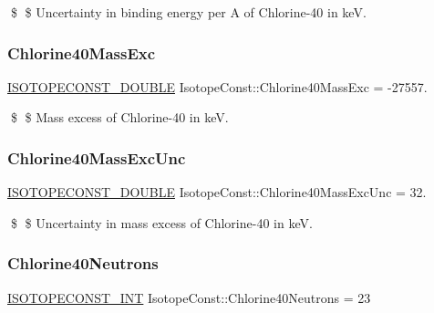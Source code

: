 \$ \$ Uncertainty in binding energy per A of Chlorine-\/40 in keV. \mbox{\label{group___isotope_const-_chlorine-_cl40_ga1b5ec545efeac4e0b2e7839cabdc1717}} 
\subsubsection{\texorpdfstring{Chlorine40\+Mass\+Exc}{Chlorine40MassExc}}
{\footnotesize\ttfamily \mbox{\hyperlink{group___isotope_const-_macros_ga8f45a7272ce02c0b4c65c44636ed719a}{I\+S\+O\+T\+O\+P\+E\+C\+O\+N\+S\+T\+\_\+\+D\+O\+U\+B\+LE}} Isotope\+Const\+::\+Chlorine40\+Mass\+Exc = -\/27557.}

\$ \$ Mass excess of Chlorine-\/40 in keV. \mbox{\label{group___isotope_const-_chlorine-_cl40_gab73c5ff7e45bb4f9081406d84864eee1}} 
\subsubsection{\texorpdfstring{Chlorine40\+Mass\+Exc\+Unc}{Chlorine40MassExcUnc}}
{\footnotesize\ttfamily \mbox{\hyperlink{group___isotope_const-_macros_ga8f45a7272ce02c0b4c65c44636ed719a}{I\+S\+O\+T\+O\+P\+E\+C\+O\+N\+S\+T\+\_\+\+D\+O\+U\+B\+LE}} Isotope\+Const\+::\+Chlorine40\+Mass\+Exc\+Unc = 32.}

\$ \$ Uncertainty in mass excess of Chlorine-\/40 in keV. \mbox{\label{group___isotope_const-_chlorine-_cl40_gabef7299db2173555b609e1d951a65f2f}} 
\subsubsection{\texorpdfstring{Chlorine40\+Neutrons}{Chlorine40Neutrons}}
{\footnotesize\ttfamily \mbox{\hyperlink{group___isotope_const-_macros_ga5f18360b3e99483a35c32d789e62621c}{I\+S\+O\+T\+O\+P\+E\+C\+O\+N\+S\+T\+\_\+\+I\+NT}} Isotope\+Const\+::\+Chlorine40\+Neutrons = 23}

